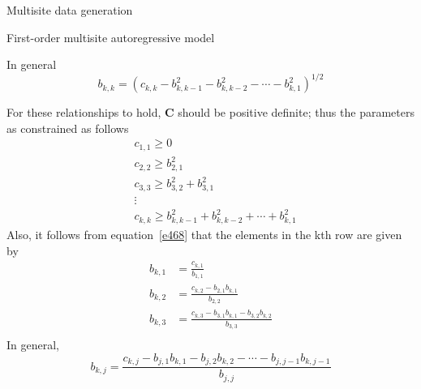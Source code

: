 \documentclass[8pt]{beamer}
\begin{document}
\begin{frame}{Multisite data generation}
    \begin{block}{First-order multisite autoregressive model}
    \end{block}
    In general 
    \begin{equation}
        b_{k,k} = \left(c_{k,k} - b_{k,k-1}^2 - b_{k,k-2}^2 - \cdots - b_{k,1}^2 \right)^{1/2}
        \label{e470}
    \end{equation}

    For these relationships to hold, $\mathbf{C}$ should be positive definite; thus the parameters as constrained as follows
\begin{equation}
\begin{aligned}
    &c_{1,1} \geq 0\\
    &c_{2,2} \geq b_{2,1}^2\\
    &c_{3,3} \geq b_{3,2}^2 + b_{3,1}^2\\
    &\vdots \\
    &c_{k,k} \geq b_{k,k-1}^2 + b_{k,k-2}^2 + \cdots + b_{k,1}^2
\end{aligned}
\label{e471}
\end{equation}
Also, it follows from equation~\ref{e468} that the elements in the kth row are given by 
\vspace{-5pt}
\begin{align*}
    b_{k,1} &= \frac{c_{k,1}}{b_{1,1}}\\
    b_{k,2} &= \frac{c_{k,2} - b_{2,1} b_{k,1}}{b_{2,2}}\\
    b_{k,3} &= \frac{c_{k,3} - b_{3,1} b_{k,1} - b_{3,2} b_{k,2}}{b_{3,3}}\\
\end{align*}
\vspace{-15pt}
In general, 
\vspace{-5pt}
    \begin{equation}
    b_{k,j} = \frac{c_{k,j} - b_{j,1}b_{k,1} - b_{j,2}b_{k,2} - \cdots - b_{j,j-1}b_{k,j-1}}{b_{j,j}} 
        \label{e472}
    \end{equation}
\end{frame}
\end{document}
